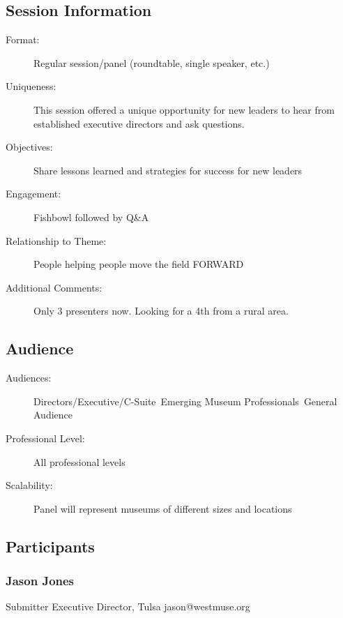 \documentclass{report}
\begin{document}
              \subsection*{Session Information}
                \begin{description}
                  \item [Format:] Regular session/panel (roundtable, single speaker, etc.)
							    
							    \item [Uniqueness:]This session offered a unique opportunity for new leaders to hear from established executive directors and ask questions.
							    \item [Objectives:]Share lessons learned and strategies for success for new leaders
							    \item [Engagement:]Fishbowl followed by Q\&A
							    \item [Relationship to Theme:]People helping people move the field FORWARD
							    
                    \item [Additional Comments: ]Only 3 presenters now. Looking for a 4th from a rural area.

                \end{description}
              \subsection*{Audience}
                \begin{description}
                  \item [Audiences:]Directors/Executive/C-Suite~Emerging Museum Professionals~General Audience~
                  \item[Professional Level:]All professional levels~
                \item[Scalability:] Panel will represent museums of different sizes and locations

							
              \end{description}
            \subsection*{Participants}
              \subsubsection*{ Jason  Jones }
              Submitter\newline
              Executive Director, Tulsa
              \newline
              jason@westmuse.org\newline
              
\end{document}
